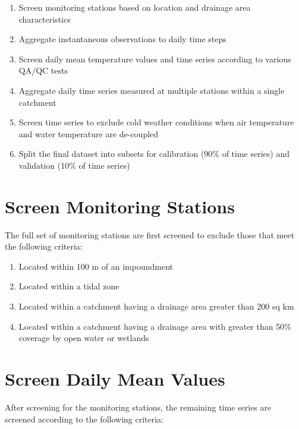\documentclass[]{book}
\providecommand{\tightlist}{%
  \setlength{\itemsep}{0pt}\setlength{\parskip}{0pt}}
\begin{document}
\begin{enumerate}
\def\labelenumi{\arabic{enumi}.}
\tightlist
\item
  Screen monitoring stations based on location and drainage area characteristics
\item
  Aggregate instantaneous observations to daily time steps
\item
  Screen daily mean temperature values and time series according to various QA/QC tests
\item
  Aggregate daily time series measured at multiple stations within a single catchment
\item
  Screen time series to exclude cold weather conditions when air temperature and water temperature are de-coupled
\item
  Split the final dataset into subsets for calibration (90\% of time series) and validation (10\% of time series)
\end{enumerate}

\hypertarget{screen-monitoring-stations}{%
\section{Screen Monitoring Stations}\label{screen-monitoring-stations}}

The full set of monitoring stations are first screened to exclude those that meet the following criteria:

\begin{enumerate}
\def\labelenumi{\arabic{enumi}.}
\tightlist
\item
  Located within 100 m of an impoundment
\item
  Located within a tidal zone
\item
  Located within a catchment having a drainage area greater than 200 sq km
\item
  Located within a catchment having a drainage area with greater than 50\% coverage by open water or wetlands
\end{enumerate}

\hypertarget{screen-daily-mean-values}{%
\section{Screen Daily Mean Values}\label{screen-daily-mean-values}}

After screening for the monitoring stations, the remaining time series are screened according to the following criteria:
\end{document}
